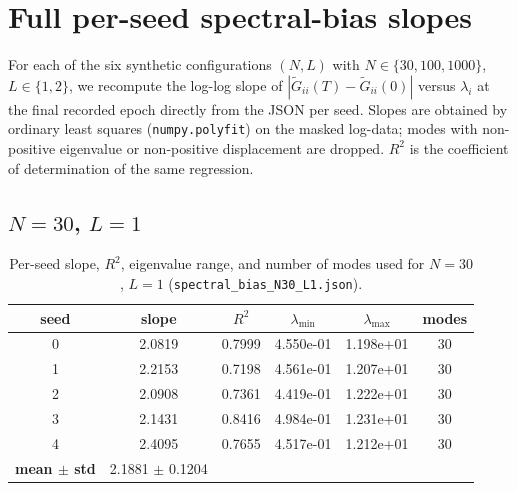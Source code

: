\section{Full per-seed spectral-bias slopes}
\label{app:per-seed-slopes}

For each of the six synthetic configurations $(N, L)$ with $N \in \{30, 100, 1000\}$, $L \in \{1, 2\}$, we recompute the log-log slope of $|\widetilde{G}_{ii}(T) - \widetilde{G}_{ii}(0)|$ versus $\lambda_i$ at the final recorded epoch directly from the JSON per seed. Slopes are obtained by ordinary least squares (\texttt{numpy.polyfit}) on the masked log-data; modes with non-positive eigenvalue or non-positive displacement are dropped. $R^2$ is the coefficient of determination of the same regression.

\subsection{$N=30$, $L=1$}
\begin{table}[H]
\centering
\caption{Per-seed slope, $R^2$, eigenvalue range, and number of modes used for $N=30$, $L=1$ (\texttt{spectral\_bias\_N30\_L1.json}).}
\label{tab:slopeA-N30-L1}
\begin{tabular}{c c c c c c}
\toprule
seed & slope & $R^2$ & $\lambda_{\min}$ & $\lambda_{\max}$ & modes \\
\midrule
0 & 2.0819 & 0.7999 & 4.550e-01 & 1.198e+01 & 30 \\
1 & 2.2153 & 0.7198 & 4.561e-01 & 1.207e+01 & 30 \\
2 & 2.0908 & 0.7361 & 4.419e-01 & 1.222e+01 & 30 \\
3 & 2.1431 & 0.8416 & 4.984e-01 & 1.231e+01 & 30 \\
4 & 2.4095 & 0.7655 & 4.517e-01 & 1.212e+01 & 30 \\
\midrule
\textbf{mean $\pm$ std} & 2.1881 $\pm$ 0.1204 & \multicolumn{4}{l}{} \\
\bottomrule
\end{tabular}
\end{table}

